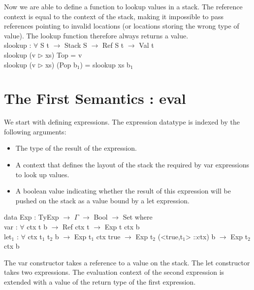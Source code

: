 \documentclass[paper=a4, fontsize=11pt]{scrartcl} %
\numberwithin{equation}{section} %
\numberwithin{figure}{section} %
\numberwithin{table}{section} %
\begin{document}
Now we are able to define a function to lookup values in a stack. The reference context is equal to the context of the stack, making it impossible to pass references pointing to invalid locations (or locations storing the wrong type of value). The lookup function therefore always returns a value.\\

\ttfamily
slookup : $\forall$ {S t} $\rightarrow$ Stack S $\rightarrow$ Ref S t $\rightarrow$ Val t\\
slookup (v $\rhd$ xs) Top = v\\
slookup (v $\rhd$ xs) (Pop b$_1$) = slookup xs b$_1$\\

\normalfont

\section{The First Semantics : eval}

We start with defining expressions. The expression datatype is indexed by the following arguments: \\

\begin{itemize}
  \item The type of the result of the expression.
  \item A context that defines the layout of the stack the required by \ttfamily var \normalfont expressions to look up values.
  \item A boolean value indicating whether the result of this expression will be pushed on the stack as a value bound by a let expression.
\end{itemize}

\ttfamily

data Exp : TyExp $\rightarrow$ $\Gamma$ $\rightarrow$ Bool $\rightarrow$ Set where\\
\hspace*{5mm}var  : $\forall$ {ctx t b} $\rightarrow$ Ref ctx t $\rightarrow$ Exp t ctx b\\
\hspace*{5mm}let$_1$ : $\forall$ {ctx t$_1$ t$_2$ b} $\rightarrow$ Exp t$_1$ ctx true $\rightarrow$ Exp t$_2$ (<true,t$_1$>  ::ctx) b $\rightarrow$ Exp t$_2$ ctx b\\

\normalfont

The \ttfamily var \normalfont constructor takes a reference to a value on the stack. The let constructor takes two expressions. The evaluation context of the second expression is extended with a value of the return type of the first expression.\\
\end{document}
